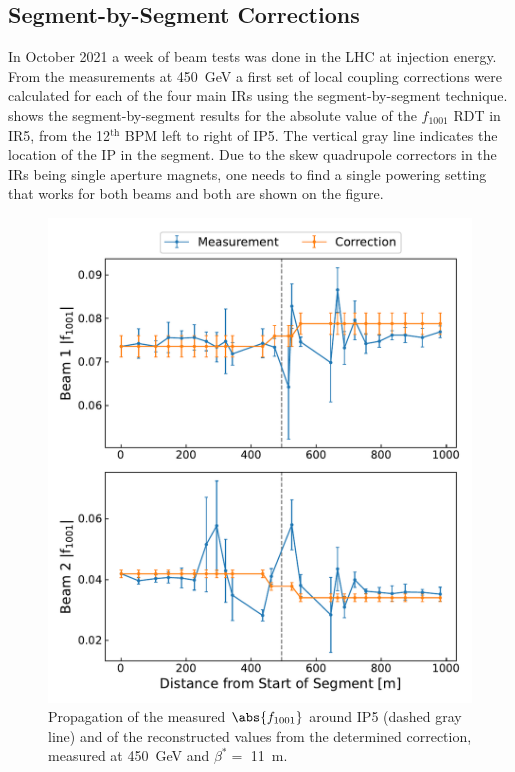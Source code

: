 \subsection{Segment-by-Segment Corrections}
\label{subsection:sbs_corrections}

In October \num{2021} a week of beam tests was done in the LHC at injection energy.
From the measurements at \qty{450}{\giga\electronvolt} a first set of local coupling corrections were calculated for each of the four main IRs using the segment-by-segment technique.
 shows the segment-by-segment results for the absolute value of the \(f_{1001}\) RDT in IR\num{5}, from the \num{12}\({}^\mathrm{th}\) BPM left to right of IP\num{5}.
The vertical gray line indicates the location of the IP in the segment.
Due to the skew quadrupole correctors in the IRs being single aperture magnets, one needs to find a single powering setting that works for both beams and both are shown on the figure.

\begin{figure}[!htb]
    \centering
    \includegraphics*[width=\textwidth]{Figures/IR_Coupling_Correction/beamtest_sbs_abs_f1001_ip5.pdf}
    \caption{Propagation of the measured \(\abs{f_{1001}}\) around IP\num{5} (dashed gray line) and of the reconstructed values from the determined correction, measured at \qty{450}{\giga\electronvolt} and \(\beta^{*}=\) \qty{11}{\meter}.}
    \label{figure:beam_test_sbs_abs_f1001_ip5}
\end{figure}

